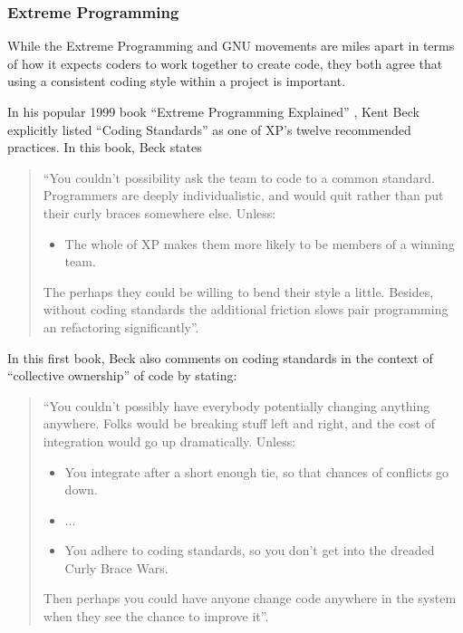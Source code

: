 %
\subsubsection{Extreme Programming}
%

While the Extreme Programming and GNU movements are miles apart in terms of
how it expects coders to work together to create code, they both agree that
using a consistent coding style within a project is important.

In his popular 1999 book ``Extreme Programming Explained''
{}\cite{ExtremeProgrammingExplained99}, Kent Beck explicitly listed ``Coding
Standards'' as one of XP's twelve recommended practices.  In this book, Beck
states

\begin{quote}

``You couldn't possibility ask the team to code to a common standard.
Programmers are deeply individualistic, and would quit rather than put their
curly braces somewhere else. Unless:

\begin{itemize}

{}\item The whole of XP makes them more likely to be members of a winning
team.

\end{itemize}

The perhaps they could be willing to bend their style a little.  Besides,
without coding standards the additional friction slows pair programming an
refactoring significantly''.

\end{quote}

In this first book, Beck also comments on coding standards in the context of
``collective ownership'' of code by stating:

\begin{quote}

``You couldn't possibly have everybody potentially changing anything anywhere.
Folks would be breaking stuff left and right, and the cost of integration
would go up dramatically.  Unless:

\begin{itemize}

{}\item You integrate after a short enough tie, so that chances of conflicts
go down.

{}\item ...

{}\item You adhere to coding standards, so you don't get into the dreaded
Curly Brace Wars.

\end{itemize}

Then perhaps you could have anyone change code anywhere in the system when
they see the chance to improve it''.

\end{quote}

